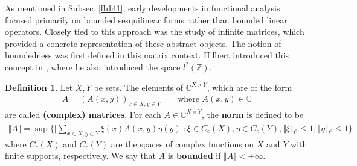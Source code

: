 \documentclass[12pt,b5paper,notitlepage]{article}
\theoremstyle{definition}
\newtheorem{df}{Definition}[subsection]
\theoremstyle{plain}
\newcommand{\ovl}{\overline}
\newcommand{\Cbb}{\mathbb C}
\newcommand{\Zbb}{\mathbb Z}
\numberwithin{equation}{section}
\begin{document}
As mentioned in Subsec. \ref{lb141}, early developments in functional analysis focused primarily on bounded sesquilinear forms rather than bounded linear operators. Closely tied to this approach was the study of infinite matrices, which provided a concrete representation of these abstract objects. The notion of boundedness was first defined in this matrix context. Hilbert introduced this concept in \cite{Hil06}, where he also introduced the space $l^2(\Zbb)$. 





\begin{df}
Let $X,Y$ be sets. The elements of $\Cbb^{X\times Y}$, which are of the form
\begin{align*}
A=(A(x,y))_{x\in X,y\in Y}\qquad\text{where }A(x,y)\in\Cbb
\end{align*}
are called \textbf{ (complex) matrices}. For each $A\in \Cbb^{X\times Y}$, the \textbf{norm }  is defined to be
\begin{gather}\label{eq71}
\Vert A\Vert=\sup\bigg\{\bigg|\sum_{x\in X,y\in Y}\ovl{\xi(x)}A(x,y)\eta(y)\bigg|:\xi\in C_c(X),\eta\in C_c(Y),\Vert \xi\Vert_{l^2}\leq1,\Vert\eta\Vert_{l^2}\leq1\bigg\}
\end{gather}
where $C_c(X)$ and $C_c(Y)$ are the spaces of complex functions on $X$ and $Y$ with finite supports, respectively. We say that $A$ is \textbf{bounded}  if $\Vert A\Vert<+\infty$.
\end{df}
\end{document}
